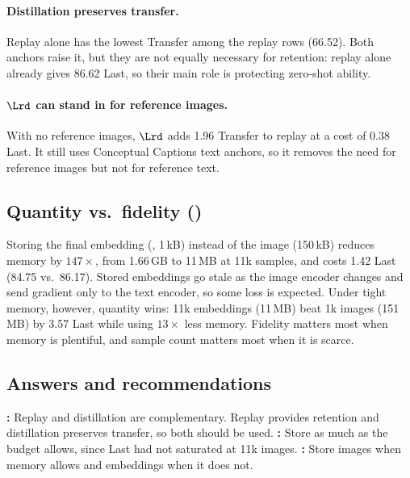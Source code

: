 \paragraph{Distillation preserves transfer.}
Replay alone has the lowest Transfer among the replay rows (66.52). Both anchors
raise it, but they are not equally necessary for retention: replay alone already
gives 86.62 Last, so their main role is protecting zero-shot ability.

\paragraph{$\Lrd$ can stand in for reference images.}
With no reference images, $\Lrd$ adds 1.96 Transfer to replay at a cost of 0.38
Last. It still uses Conceptual Captions text anchors, so it removes the need for
reference images but not for reference text. 

\subsection{Quantity vs.\ fidelity ()}
\label{sec:disc-fidelity}
Storing the final embedding (, 1\,kB) instead of the image (150\,kB)
reduces memory by $147\times$, from 1.66\,GB to 11\,MB at 11k samples, and costs
1.42 Last (84.75 vs.\ 86.17). Stored embeddings go stale as the image
encoder changes and send gradient only to the text encoder, so some loss is
expected. Under tight memory, however, quantity wins: 11k embeddings (11\,MB) beat
1k images (151\,MB) by 3.57 Last while using $13\times$ less memory. Fidelity
matters most when memory is plentiful, and sample count matters most when it is
scarce. 

\subsection{Answers and recommendations}
\label{sec:answers}
\textbf{:} Replay and distillation are complementary. Replay provides
retention and distillation preserves transfer, so both should be used.
\textbf{:} Store as much as the budget allows, since Last had not saturated
at 11k images. 
\textbf{:} Store images when memory allows and embeddings when it does not.

